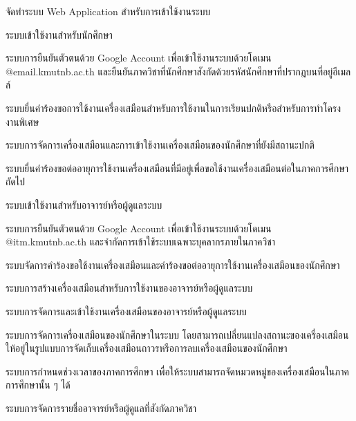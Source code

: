 \begin{mycustomenum2}
    \item จัดทำระบบ Web Application สำหรับการเข้าใช้งานระบบ
    \begin{mycustomenum2}
        \item ระบบเข้าใช้งานสำหรับนักศึกษา
        \begin{mycustomenum2}
            \item ระบบการยืนยันตัวตนด้วย Google Account เพื่อเข้าใช้งานระบบด้วยโดเมน @email.kmutnb.ac.th และยืนยันภาควิชาที่นักศึกษาสังกัดด้วยรหัสนักศึกษาที่ปรากฎบนที่อยู่อีเมลล์
            \item ระบบยื่นคำร้องขอการใช้งานเครื่องเสมือนสำหรับการใช้งานในการเรียนปกติหรือสำหรับการทำโครงงานพิเศษ
            \item ระบบการจัดการเครื่องเสมือนและการเข้าใช้งานเครื่องเสมือนของนักศึกษาที่ยังมีสถานะปกติ
            \item ระบบยื่นคำร้องขอต่ออายุการใช้งานเครื่องเสมือนที่มีอยู่เพื่อขอใช้งานเครื่องเสมือนต่อในภาคการศึกษาถัดไป
        \end{mycustomenum2}            
        \item ระบบเข้าใช้งานสำหรับอาจารย์หรือผู้ดูแลระบบ
        \begin{mycustomenum2}
            \item ระบบการยืนยันตัวตนด้วย Google Account เพื่อเข้าใช้งานระบบด้วยโดเมน @itm.kmutnb.ac.th และจำกัดการเข้าใช้ระบบเฉพาะบุคลากรภายในภาควิชา
            \item ระบบจัดการคำร้องขอใช้งานเครื่องเสมือนและคำร้องขอต่ออายุการใช้งานเครื่องเสมือนของนักศึกษา
            \item ระบบการสร้างเครื่องเสมือนสำหรับการใช้งานของอาจารย์หรือผู้ดูแลระบบ
            \item ระบบการจัดการและเข้าใช้งานเครื่องเสมือนของอาจารย์หรือผู้ดูแลระบบ
            \item ระบบการจัดการเครื่องเสมือนของนักศึกษาในระบบ โดยสามารถเปลี่ยนแปลงสถานะของเครื่องเสมือนให้อยู่ในรูปแบบการจัดเก็บเครื่องเสมือนถาวรหรือการลบเครื่องเสมือนของนักศึกษา
            \item ระบบการกำหนดช่วงเวลาของภาคการศึกษา เพื่อให้ระบบสามารถจัดหมวดหมู่ของเครื่องเสมือนในภาคการศึกษานั้น ๆ ได้
            \item ระบบการจัดการรายชื่ออาจารย์หรือผู้ดูแลที่สังกัดภาควิชา
        \end{mycustomenum2}  
    \end{mycustomenum2}
\end{mycustomenum2}


